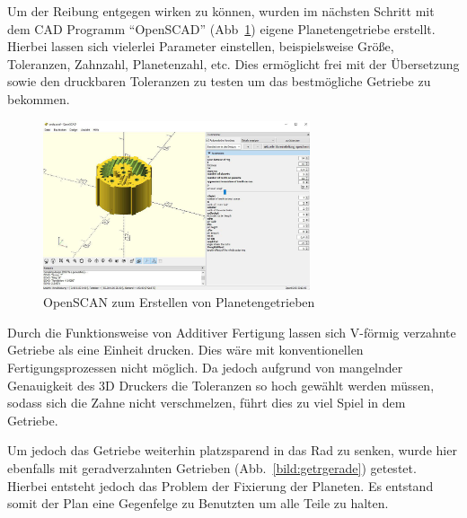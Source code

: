 Um der Reibung entgegen wirken zu können, wurden im nächsten Schritt mit dem CAD Programm ``OpenSCAD'' (Abb~\ref{bild:gearversion2}) eigene Planetengetriebe erstellt.
Hierbei lassen sich vielerlei Parameter einstellen, beispielsweise Größe, Toleranzen, Zahnzahl, Planetenzahl, etc.
Dies ermöglicht frei mit der Übersetzung sowie den druckbaren Toleranzen zu testen um das bestmögliche Getriebe zu bekommen.
\begin{figure}[!ht]
	\centering
	\includegraphics[width=0.7\textwidth]{bilder/GetriebeVersion2.jpg}
	\caption{OpenSCAN zum Erstellen von Planetengetrieben}
	\label{bild:gearversion2}
\end{figure}

Durch die Funktionsweise von Additiver Fertigung lassen sich V-förmig verzahnte Getriebe als eine Einheit drucken.
Dies wäre mit konventionellen Fertigungsprozessen nicht möglich.
Da jedoch aufgrund von mangelnder Genauigkeit des 3D Druckers die Toleranzen so hoch gewählt werden müssen, 
sodass sich die Zahne nicht verschmelzen, führt dies zu viel Spiel in dem Getriebe.

Um jedoch das Getriebe weiterhin platzsparend in das Rad zu senken, wurde hier ebenfalls mit geradverzahnten Getrieben (Abb.~\ref{bild:getrgerade}) getestet.
Hierbei entsteht jedoch das Problem der Fixierung der Planeten. Es entstand somit der Plan eine Gegenfelge zu Benutzten um alle Teile zu halten.

